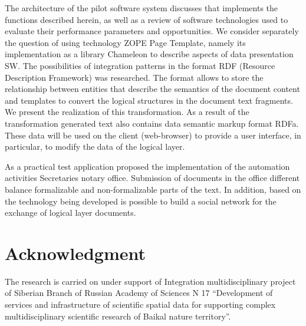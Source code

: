 \documentclass[conference]{IEEEtran}
\begin{document}
	The architecture of the pilot software system discusses that implements the functions described herein, as well as a review of software technologies used to evaluate their performance parameters and opportunities. We consider separately the question of using technology ZOPE Page Template, namely its implementation as a library Chameleon to describe aspects of data presentation SW. The possibilities of integration patterns in the format RDF (Resource Description Framework) was researched. The format allows to store the relationship between entities that describe the semantics of the document content and templates to convert the logical structures in the document text fragments. We present the realization of this transformation. As a result of the transformation generated text also contains data semantic markup format RDFa. These data will be used on the client (web-browser) to provide a user interface, in particular, to modify the data of the logical layer.

	As a practical test application proposed the implementation of the automation activities Secretaries notary office.  Submission of documents in the office different balance formalizable and non-formalizable parts of the text. In addition, based on the technology being developed is possible to build a social network for the exchange of logical layer documents.


\section*{Acknowledgment}
The research is carried on under support of Integration multidisciplinary project of Siberian Branch of Russian Academy of Sciences N 17 “Development of services and infrastructure of scientific spatial data for supporting complex multidisciplinary scientific research of Baikal nature territory”.







\end{document}
